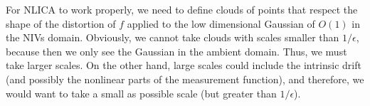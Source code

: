 \documentclass[12pt]{article}
\begin{document}
For NLICA to work properly, we need to define clouds of points that respect the shape of the distortion of $f$ applied to the low dimensional Gaussian of $O(1)$ in the NIVs domain. Obviously, we cannot take clouds with scales smaller than $1/\epsilon$, because then we only see the Gaussian in the ambient domain. Thus, we must take larger scales. On the other hand, large scales could include the intrinsic drift (and possibly the nonlinear parts of the measurement function), and therefore, we would want to take a small as possible scale (but greater than $1/\epsilon$). 
\end{document}
